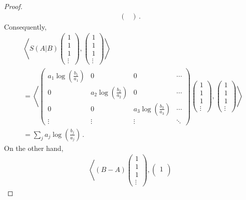 \documentclass[12pt, reqno]{amsart}
\theoremstyle{definition}
\theoremstyle{remark}
\numberwithin{equation}{section}
\begin{document}
\begin{proof}
\begin{align*}
\begin{pmatrix}
	\end{pmatrix}\,.
	\end{align*}
	Consequently,
	\begin{align*}
	&\left\langle S(A|B) \begin{pmatrix}
	1\\
	1\\
	1\\
	\vdots
	\end{pmatrix},
	\begin{pmatrix}
	1\\
	1\\
	1\\
	\vdots
	\end{pmatrix}\right\rangle\\
	&=\left\langle
	\begin{pmatrix}
	a_1\log\left(\frac{b_1}{a_1}\right) &                                 0                                  &                              0                     & \cdots \\
	0                                                    & a_2\log\left(\frac{b_2}{a_2}\right) &     0                  & \cdots\\
	0                        &     0       & a_3\log\left(\frac{b_3}{a_3}\right) &           \cdots\\
	\vdots               & \vdots               & \vdots                & \ddots
	\end{pmatrix}
	\begin{pmatrix}
	1\\
	1\\
	1\\
	\vdots
	\end{pmatrix},
	\begin{pmatrix}
	1\\
	1\\
	1\\
	\vdots
	\end{pmatrix}\right\rangle\\
	&=\sum_{j} a_j \log\left(\frac{b_j}{a_j}\right)\,.
	\end{align*}
	On the other hand, 
	\begin{align*}
	\left\langle (B-A)
	\begin{pmatrix}
	1\\
	1\\
	1\\
	\vdots
	\end{pmatrix},
	\begin{pmatrix}
	1\\

\end{pmatrix}
\end{align*}
\end{proof}
\end{document}

